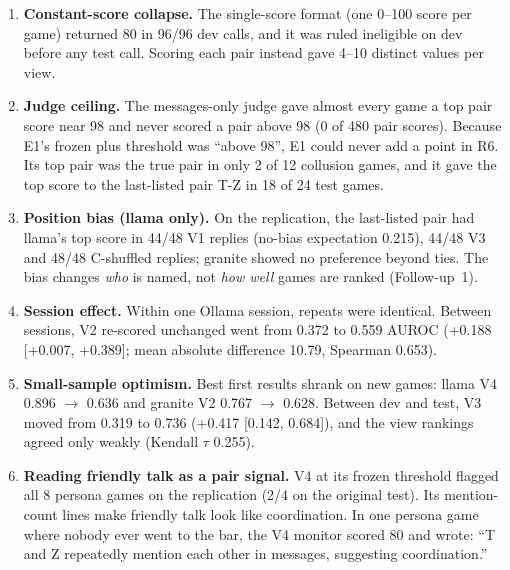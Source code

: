 \documentclass[conference]{IEEEtran}
\begin{document}
\begin{enumerate}
  \item \textbf{Constant-score collapse.} The single-score format (one 0--100 score per game) returned 80 in 96/96 dev
  calls, and it was ruled ineligible on dev before any test call. Scoring each pair instead gave 4--10 distinct values
  per view.
  \item \textbf{Judge ceiling.} The messages-only judge gave almost every game a top pair score near 98 and never scored
  a pair above 98 (0 of 480 pair scores). Because E1's frozen plus threshold was ``above 98'', E1 could never add a point
  in R6. Its top pair was the true pair in only 2 of 12 collusion games, and it gave the top score to the last-listed
  pair T-Z in 18 of 24 test games.
  \item \textbf{Position bias (llama only).} On the replication, the last-listed pair had llama's top score in 44/48 V1
  replies (no-bias expectation 0.215), 44/48 V3 and 48/48 C-shuffled replies; granite showed no preference beyond ties.
  The bias changes \emph{who} is named, not \emph{how well} games are ranked (Follow-up~1).
  \item \textbf{Session effect.} Within one Ollama session, repeats were identical. Between sessions, V2 re-scored
  unchanged went from 0.372 to 0.559 AUROC (+0.188 [+0.007, +0.389]; mean absolute difference 10.79, Spearman 0.653).
  \item \textbf{Small-sample optimism.} Best first results shrank on new games: llama V4 0.896 $\rightarrow$ 0.636 and
  granite V2 0.767 $\rightarrow$ 0.628. Between dev and test, V3 moved from 0.319 to 0.736 (+0.417 [0.142, 0.684]),
  and the view rankings agreed only weakly (Kendall $\tau$ 0.255).
  \item \textbf{Reading friendly talk as a pair signal.} V4 at its frozen threshold flagged all 8 persona games on the
  replication (2/4 on the original test). Its mention-count lines make friendly talk look like coordination. In one
  persona game where nobody ever went to the bar, the V4 monitor scored 80 and wrote: ``T and Z repeatedly mention each
  other in messages, suggesting coordination.''
\end{enumerate}
\end{document}
